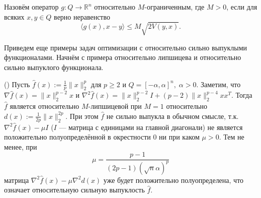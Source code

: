     \begin{definition}\label{DefRelBound}\cite{Main}
        Назовём оператор $g: Q \longrightarrow \mathbb{R}^n$ относительно $M$-ограниченным, где $M >0$, если для всяких $x, y \in Q$ верно неравенство
        \begin{equation}\label{rel_bound}
             \langle g(x), x - y \rangle \leq M\sqrt{2V(y,x)}.
         \end{equation}
    \end{definition}
    \iffalse
        \begin{definition}\cite{Inex}
            \fixme{[FIXME] Мне кажется тоже нужно, но может стоит убрать} Назовём оператор $g: Q \longrightarrow \mathbb{R}^n$ относительно $L$-гладким, где $L > 0$, если для всяких $x, y, z \in Q$ верно неравенство
            \begin{equation}\label{rel_smooth}
                \langle g(y)-g(z),x-z\rangle \leq LV(x,z) + LV(z,y).
            \end{equation}
        \end{definition}
        Отметим, что если функция $f$ $L$-относительно гладкая \cite{Bauschke}, т.е.
        \begin{equation}\label{funct_rel_smooth}
            f(y) \leq f(x) + \langle \nabla f(x), y - x\rangle + LV(y, x) \quad \forall x, y \in Q,
        \end{equation}
        то оператор $g(x) = \nabla f(x)$ удовлетворяет \eqref{rel_smooth}. Однако в случае непотенциального оператора $g$ условие \eqref{rel_smooth} не сводится, вообще говоря, к \eqref{funct_rel_smooth} для какой-нибудь функции $f$.
    \fi

    Приведем еще примеры задач оптимизации с относительно сильно выпуклыми функционалами. Начнём с примера относительно липшицева и относительно сильно выпуклого функционала.

    \begin{example} (\cite{Zhou_NIPS_2020}) 
        Пусть $\widehat{f}(x) := \frac{1}{p} \|x\|_2^p$ для $p \geq 2$ и $ Q = [-\alpha, \alpha]^n, \; \alpha > 0$. Заметим, что $\nabla \widehat{f}(x) = \|x\|_2^{p - 2} x$ и $\nabla^2 \widehat{f}(x) = \|x\|_2^{p - 2} I + (p-2)\|x\|_2^{p - 4} x x^{T}$. Тогда $\widehat{f}$ является относительно $M$-липшицевой при $M = 1$ относительно $d(x) := \frac{1}{2p}\|x\|_2^{2p}$. При этом $\widehat{f}$ не сильно выпукла в обычном смысле, т.к. $\nabla^2 \widehat{f}(x) - \mu I$ ($I$ --- матрица с единицами на главной диагонали) не является положительно полуопределённой в окрестности 0 ни при каком $\mu >0$. Тем не менее, при 
        \begin{equation}\label{eq_mu}
            \mu = \frac{p-1}{(2p - 1)(\sqrt{n}\alpha)^p}  
        \end{equation}
        матрица $\nabla^2 \widehat{f}(x) - \mu \nabla^2 d(x)$ уже будет  положительно полуопределена, что означает относительную сильную выпуклость $\widehat{f}$.
        \label{ex_experiments}
    \end{example}

